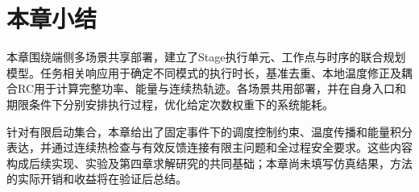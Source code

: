 \section{本章小结}

本章围绕端侧多场景共享部署，建立了Stage执行单元、工作点与时序的联合规划模型。任务相关响应用于确定不同模式的执行时长，基准去重、本地温度修正及耦合RC用于计算完整功率、能量与连续热轨迹。各场景共用部署，并在自身入口和期限条件下分别安排执行过程，优化给定次数权重下的系统能耗。

针对有限启动集合，本章给出了固定事件下的调度控制约束、温度传播和能量积分表达，并通过连续热检查与有效反馈连接有限主问题和全过程安全要求。这些内容构成后续实现、实验及第四章求解研究的共同基础；本章尚未填写仿真结果，方法的实际开销和收益将在验证后总结。



